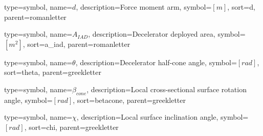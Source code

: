 {
	type=symbol, %
	name={\ensuremath{d}}, %
	description={Force moment arm}, %
	symbol={$\left[m \right]$}, %
	sort=d, %
	parent=romanletter %
}

{
type=symbol, %
name={\ensuremath{A_{IAD}}}, %
description={Decelerator deployed area}, %
symbol={$\left[m^2 \right]$}, %
sort=a_iad, %
parent=romanletter %
}

{
type=symbol, %
name={\ensuremath{\theta}}, %
description={Decelerator half-cone angle}, %
symbol={$\left[rad \right]$}, %
sort=theta, %
parent=greekletter %
}

{
	type=symbol, %
	name={\ensuremath{\beta_{cone}}}, %
	description={Local cross-sectional surface rotation angle}, %
	symbol={$\left[rad \right]$}, %
	sort=betacone, %
	parent=greekletter %
}

{
	type=symbol, %
	name={\ensuremath{\chi}}, %
	description={Local surface inclination angle}, %
	symbol={$\left[rad \right]$}, %
	sort=chi, %
	parent=greekletter %
}

